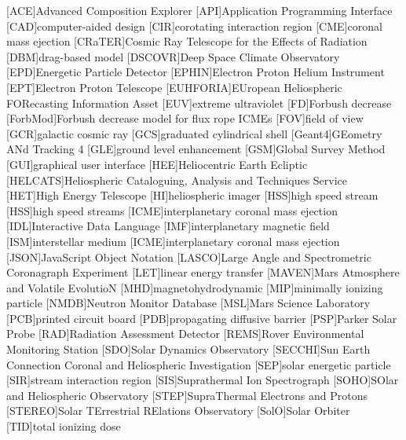 	\begin{acronym}\itemsep0pt
	[ACE]{Advanced Composition Explorer}
	[API]{Application Programming Interface}
	[CAD]{computer-aided design}
	[CIR]{corotating interaction region}
	[CME]{coronal mass ejection}
	[CRaTER]{Cosmic Ray Telescope for the Effects of Radiation}
	[DBM]{drag-based model}
	[DSCOVR]{Deep Space Climate Observatory}
	[EPD]{Energetic Particle Detector}
	[EPHIN]{Electron Proton Helium Instrument}
	[EPT]{Electron Proton Telescope}
    [EUHFORIA]{EUropean Heliospheric FORecasting Information Asset}
	[EUV]{extreme ultraviolet}
	[FD]{Forbush decrease}
	[ForbMod]{Forbush decrease model for flux rope ICMEs}
	[FOV]{field of view}
	[GCR]{galactic cosmic ray}
	[GCS]{graduated cylindrical shell}
	[Geant4]{GEometry ANd Tracking 4}
	[GLE]{ground level enhancement}
	[GSM]{Global Survey Method}
	[GUI]{graphical user interface}
	[HEE]{Heliocentric Earth Ecliptic}
	[HELCATS]{Heliospheric Cataloguing, Analysis and Techniques Service}
	[HET]{High Energy Telescope}
	[HI]{heliospheric imager}
    [HSS]{high speed stream}
    [HSS]{high speed streams}
	[ICME]{interplanetary coronal mass ejection}
	[IDL]{Interactive Data Language}
	[IMF]{interplanetary magnetic field}
    [ISM]{interstellar medium}
	[ICME]{interplanetary coronal mass ejection}
	[JSON]{JavaScript Object Notation}
    [LASCO]{Large Angle and Spectrometric Coronagraph Experiment}
	[LET]{linear energy transfer}
	[MAVEN]{Mars Atmosphere and Volatile EvolutioN}
	[MHD]{magnetohydrodynamic}
	[MIP]{minimally ionizing particle}
	[NMDB]{Neutron Monitor Database}
	[MSL]{Mars Science Laboratory}
	[PCB]{printed circuit board}
	[PDB]{propagating diffusive barrier}
	[PSP]{Parker Solar Probe}
	[RAD]{Radiation Assessment Detector}
	[REMS]{Rover Environmental Monitoring Station}
	[SDO]{Solar Dynamics Observatory}
    [SECCHI]{Sun Earth Connection Coronal and Heliospheric Investigation}
	[SEP]{solar energetic particle}
	[SIR]{stream interaction region}
	[SIS]{Suprathermal Ion Spectrograph}
	[SOHO]{SOlar and Heliospheric Observatory}
	[STEP]{SupraThermal Electrons and Protons}
	[STEREO]{Solar TErrestrial RElations Observatory}
	[SolO]{Solar Orbiter}
	[TID]{total ionizing dose}
	\end{acronym}
	

\endgroup

\cleardoublepage